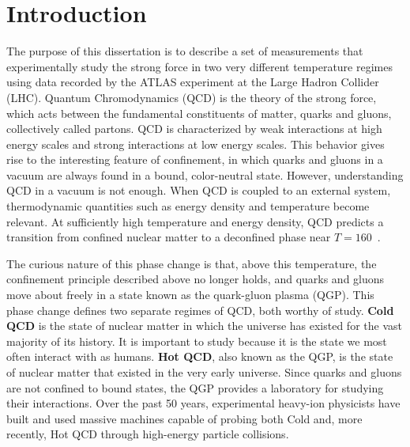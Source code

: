 \section{Introduction}
The purpose of this dissertation is to describe a set of measurements that experimentally study the strong force in two very different temperature regimes using data recorded by the ATLAS experiment at the Large Hadron Collider (LHC).
Quantum Chromodynamics (QCD) is the theory of the strong force, which acts between the fundamental constituents of matter, quarks and gluons, collectively called partons.
QCD is characterized by weak interactions at high energy scales and strong interactions at low energy scales.
This behavior gives rise to the interesting feature of confinement, in which quarks and gluons in a vacuum are always found in a bound, color-neutral state.
However, understanding QCD in a vacuum is not enough. When QCD is coupled to an external system, thermodynamic quantities such as energy density and temperature become relevant.
At sufficiently high temperature and energy density, QCD predicts a transition from confined nuclear matter to a deconfined phase near $T=160$~\MeV.

The curious nature of this phase change is that, above this temperature, the confinement principle described above no longer holds, and quarks and gluons move about freely in a state known as the quark-gluon plasma (QGP).
This phase change defines two separate regimes of QCD, both worthy of study.
\textbf{Cold QCD} is the state of nuclear matter in which the universe has existed for the vast majority of its history.
It is important to study because it is the state we most often interact with as humans.
\textbf{Hot QCD}, also known as the QGP, is the state of nuclear matter that existed in the very early universe. Since quarks and gluons are not confined to bound states, the QGP provides a laboratory for studying their interactions.
Over the past 50 years, experimental heavy-ion physicists have built and used massive machines capable of probing both Cold and, more recently, Hot QCD through high-energy particle collisions.

